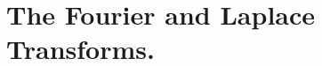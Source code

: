 \documentclass[letterpaper,12pt]{report}
\providecommand{\tightlist}{%
  \setlength{\itemsep}{0pt}\setlength{\parskip}{0pt}}
\begin{document}














\section{The Fourier and Laplace Transforms.}
\end{document}
